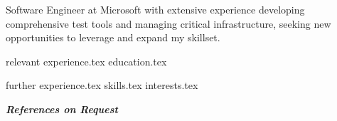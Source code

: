 \documentclass[letterpaper,12pt]{article}
\begin{document}
\thispagestyle{empty}

\vspace{0.8cm} 

Software Engineer at Microsoft with extensive experience developing comprehensive test tools and managing critical infrastructure, seeking new opportunities to leverage and expand my skillset.


{relevant experience.tex}
{education.tex}


{further experience.tex}
{skills.tex}
{interests.tex}
\thispagestyle{empty}

\vspace*{\fill}
\centering
\textit{\textbf{References on Request}}
\end{document}
